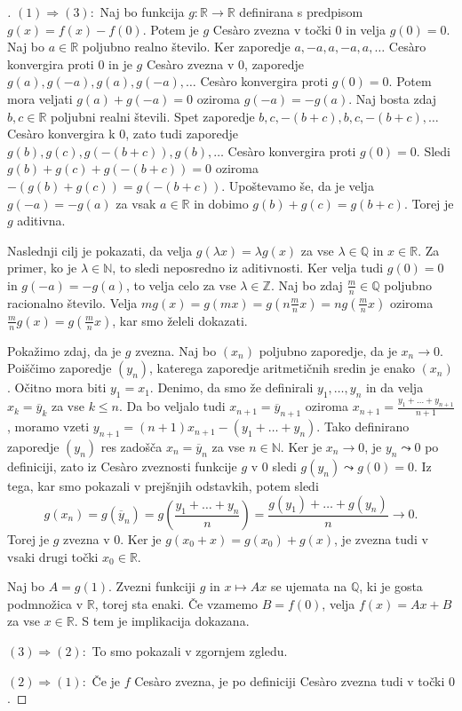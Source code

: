 \documentclass[a4paper,12pt]{article}
\theoremstyle{definition}
\theoremstyle{plain}
\newenvironment{dokaz}{\begin{proof}[\bfseries\upshape\proofname]}{\end{proof}}
\begin{document}
\begin{dokaz}
    $(1) \Rightarrow (3): $ Naj bo funkcija $g: \mathbb{R} \rightarrow \mathbb{R}$ definirana s predpisom $g(x) = f(x) - f(0)$. Potem je $g$ Ces\`{a}ro zvezna v točki $0$ in velja $g(0) = 0$. 
    Naj bo $a \in \mathbb{R}$ poljubno realno število. Ker zaporedje $a, -a, a, -a, a, \ldots$ Ces\`{a}ro konvergira proti $0$ in je $g$ Ces\`{a}ro zvezna v $0$, zaporedje $g(a), g(-a), g(a), g(-a), \ldots$ Ces\`{a}ro konvergira proti $g(0) = 0$. Potem mora veljati $g(a) + g(-a) = 0$ oziroma $g(-a) = -g(a)$. 
    Naj bosta zdaj $b, c \in \mathbb{R}$ poljubni realni števili. Spet zaporedje $b, c, -(b+c), b, c, -(b+c), \ldots$ Ces\`{a}ro konvergira k $0$, zato tudi zaporedje $g(b), g(c), g(-(b+c)), g(b), \ldots$ Ces\`{a}ro konvergira proti $g(0) = 0$. Sledi $g(b) + g(c) + g(-(b+c)) = 0$ oziroma $-(g(b) + g(c)) = g(-(b+c))$. Upoštevamo še, da je velja $g(-a) = -g(a)$ za vsak $a \in \mathbb{R}$ in dobimo $g(b) + g(c) = g(b+c)$. Torej je $g$ aditivna.

    Naslednji cilj je pokazati, da velja $g(\lambda x) = \lambda g(x)$ za vse $\lambda \in \mathbb{Q}$ in $x \in \mathbb{R}$. Za primer, ko je $\lambda \in \mathbb{N}$, to sledi neposredno iz aditivnosti. Ker velja tudi $g(0) = 0$ in $g(-a) = -g(a)$, to velja celo za vse $\lambda \in \mathbb{Z}$. Naj bo zdaj $\frac{m}{n} \in \mathbb{Q}$ poljubno racionalno število. Velja $mg(x) = g(mx) = g(n\frac{m}{n}x) = ng(\frac{m}{n}x)$ oziroma $\frac{m}{n}g(x) = g(\frac{m}{n}x)$, kar smo želeli dokazati.

    Pokažimo zdaj, da je $g$ zvezna. Naj bo $(x_n)$ poljubno zaporedje, da je $x_n \rightarrow 0$. Poiščimo zaporedje $(y_n)$, katerega zaporedje aritmetičnih sredin je enako $(x_n)$. Očitno mora biti $y_1 = x_1$. Denimo, da smo že definirali $y_1, \ldots, y_n$ in da velja $x_k = \overline{y}_k$ za vse $k \leq n$. Da bo veljalo tudi $x_{n+1} = \overline{y}_{n+1}$ oziroma $x_{n+1} = \frac{y_1 + \ldots + y_{n+1}}{n+1}$, moramo vzeti $y_{n+1} = (n+1)x_{n+1} - (y_1 + \ldots + y_n)$. Tako definirano zaporedje $(y_n)$ res zadošča $x_n = \overline{y}_n$ za vse $n \in \mathbb{N}$. Ker je $x_n \rightarrow 0$, je $y_n \leadsto 0$ po definiciji, zato iz Ces\`{a}ro zveznosti funkcije $g$ v $0$ sledi $g(y_n) \leadsto g(0) = 0$. Iz tega, kar smo pokazali v prejšnjih odstavkih, potem sledi 
    $$g(x_n) = g(\overline{y}_n) = g(\frac{y_1 + \ldots + y_n}{n}) = \frac{g(y_1) + \ldots + g(y_n)}{n} \rightarrow 0.$$
    Torej je $g$ zvezna v $0$. Ker je $g(x_0 + x) = g(x_0) + g(x)$, je zvezna tudi v vsaki drugi točki $x_0 \in \mathbb{R}$.

    Naj bo $A = g(1)$. Zvezni funkciji $g$ in $x \mapsto Ax$ se ujemata na $\mathbb{Q}$, ki je gosta podmnožica v $\mathbb{R}$, torej sta enaki. Če vzamemo $B = f(0)$, velja $f(x) = Ax + B$ za vse $x \in \mathbb{R}$. S tem je implikacija dokazana.

    $(3) \Rightarrow (2): $ To smo pokazali v zgornjem zgledu.

    $(2) \Rightarrow (1): $ Če je $f$ Ces\`{a}ro zvezna, je po definiciji Ces\`{a}ro zvezna tudi v točki $0$.
\end{dokaz}
\end{document}
